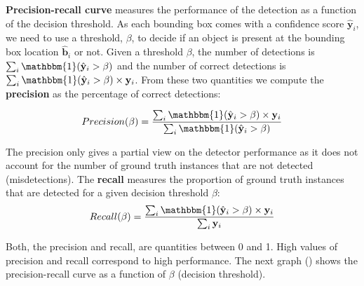     {\bf Precision-recall curve} measures the performance of the detection as a function of the decision threshold. As each bounding box comes with a confidence score $\hat{\mathbf{y}}_i$, we need to use a threshold, $\beta$, to decide if an object is present at the bounding box location $\hat{\mathbf{b}}_i$ or not. Given a threshold $\beta$, the number of detections is $\sum_i  \mathbbm{1} (\hat{\mathbf{y}}_i > \beta)$ and the number of correct detections is $\sum_i  \mathbbm{1} (\hat{\mathbf{y}}_i > \beta) \times \mathbf{y}_i$. From these two quantities we compute the {\bf precision} as the percentage of correct detections:


\begin{equation}
    Precision(\beta) = \frac{\sum_i  \mathbbm{1} (\hat{\mathbf{y}}_i > \beta) \times \mathbf{y}_i} {\sum_i  \mathbbm{1} (\hat{\mathbf{y}}_i > \beta)}
\end{equation}

The precision only gives a partial view on the detector performance as it does not account for the number of ground truth instances that are not detected (misdetections). The {\bf recall} measures the proportion of ground truth instances that are detected for a given decision threshold $\beta$:
\begin{equation}
    Recall (\beta) = \frac{\sum_i  \mathbbm{1} (\hat{\mathbf{y}}_i > \beta) \times \mathbf{y}_i} {\sum_i \mathbf{y}_i}
\end{equation}

Both, the precision and recall, are quantities between 0 and 1. High values of precision and recall correspond to high performance. The next graph (\fig{\ref{fig:example_precision_recall}}) shows the precision-recall curve as a function of $\beta$ (decision threshold).



